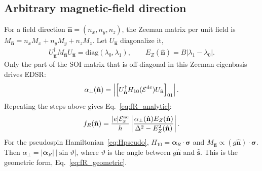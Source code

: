 \documentclass[
  aps,
  reprint,
  amsmath,
  amssymb,
  groupedaddress,
  floatfix,
  longbibliography,
]{revtex4-2}
\newcommand{\Eac}{\mathcal{E}^{\rm ac}_x}
\newcommand{\Edc}{\mathcal{E}^{\rm dc}}
\newcommand{\nhat}{\hat{\mathbf n}}
\newcommand{\shat}{\hat{\mathbf s}}
\begin{document}
\subsection{Arbitrary magnetic-field direction}
For a field direction $\nhat=(n_x,n_y,n_z)$, the Zeeman matrix per unit field is $M_{\nhat}=n_xM_x+n_yM_y+n_zM_z$. Let $U_{\nhat}$ diagonalize it,
\begin{align}
U_{\nhat}^{\dagger}
M_{\nhat}
U_{\nhat}
=
\mathrm{diag}(\lambda_0,\lambda_1),
\qquad
E_Z(\nhat)
=
B\left|\lambda_1-\lambda_0\right|.
\end{align}
Only the part of the SOI matrix that is off-diagonal in this Zeeman eigenbasis drives EDSR:
\begin{align}
\alpha_{\perp}(\nhat)
=
\left|
\left[
U_{\nhat}^{\dagger}
H_{10}(\Edc)
U_{\nhat}
\right]_{01}
\right|.
\label{eq:alpha_perp}
\end{align}
Repeating the steps above gives Eq.~\eqref{eq:fR_analytic}:
\begin{align}
f_R(\nhat)
=
\frac{|e|\Eac}{h}
\left|
\frac{
\alpha_{\perp}(\nhat)
E_Z(\nhat)
}{
\Delta^2-E_Z^2(\nhat)
}
\right|.
\end{align}
For the pseudospin Hamiltonian~\eqref{eq:Hpseudo}, $H_{10}=\bm{\alpha}_R\cdot\bm\sigma$ and $M_{\nhat}\propto(g\nhat)\cdot\bm\sigma$. Then $\alpha_\perp=|\bm{\alpha}_R|\,|\sin\vartheta|$, where $\vartheta$ is the angle between $g\nhat$ and $\shat$. This is the geometric form, Eq.~\eqref{eq:fR_geometric}.
\end{document}
